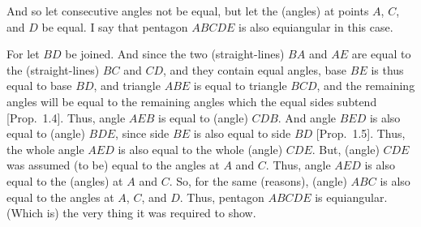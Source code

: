 \begin{Parallel}{}{}
{
\centerline{}

And so let consecutive  angles not be equal, but let
the (angles) at points $A$, $C$, and $D$ be equal. I say that pentagon $ABCDE$ is also
equiangular in this case.

For let $BD$ be joined. And since the two (straight-lines) $BA$
and $AE$ are equal to the (straight-lines) $BC$ and $CD$, and they contain
equal angles,   base $BE$ is thus equal to base $BD$, and triangle $ABE$
is equal to triangle $BCD$, and the remaining angles will be equal
to the remaining angles which the equal sides subtend [Prop.~1.4]. 
Thus, angle $AEB$ is equal to (angle) $CDB$. And angle $BED$
is also equal to (angle) $BDE$,  since side $BE$ is also equal to side
$BD$ [Prop.~1.5]. Thus, the whole angle $AED$ is also equal to the
whole (angle) $CDE$. But, (angle) $CDE$ was assumed (to be) equal
to the angles at $A$ and $C$.  Thus, angle $AED$ is also equal to the (angles)
at $A$ and $C$. So, for the same (reasons), (angle) $ABC$ is also equal
to the angles at  $A$, $C$, and $D$. Thus, pentagon $ABCDE$ is equiangular.
(Which is) the very thing it was required to show.}
\end{Parallel}

